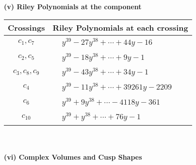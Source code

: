 \documentclass[1p]{elsarticle_modified}
\theoremstyle{definition}
\begin{document}
\newpage\renewcommand{\arraystretch}{1}
\flushleft \textbf{(v) Riley Polynomials at the component}\newline \\
\begin{tabular}{m{50pt}|m{274pt}}
Crossings & \hspace{64pt}Riley Polynomials at each crossing \\
\hline $$\begin{aligned}c_{1},c_{7}\end{aligned}$$&$\begin{aligned}
&y^{39}-27 y^{38}+\cdots+44 y-16
\end{aligned}$\\
\hline $$\begin{aligned}c_{2},c_{5}\end{aligned}$$&$\begin{aligned}
&y^{39}-18 y^{38}+\cdots+9 y-1
\end{aligned}$\\
\hline $$\begin{aligned}c_{3},c_{8},c_{9}\end{aligned}$$&$\begin{aligned}
&y^{39}-43 y^{38}+\cdots+34 y-1
\end{aligned}$\\
\hline $$\begin{aligned}c_{4}\end{aligned}$$&$\begin{aligned}
&y^{39}-11 y^{38}+\cdots+39261 y-2209
\end{aligned}$\\
\hline $$\begin{aligned}c_{6}\end{aligned}$$&$\begin{aligned}
&y^{39}+9 y^{38}+\cdots-4118 y-361
\end{aligned}$\\
\hline $$\begin{aligned}c_{10}\end{aligned}$$&$\begin{aligned}
&y^{39}+y^{38}+\cdots+76 y-1
\end{aligned}$\\
\hline
\end{tabular}\\~\\
\newpage\flushleft \textbf{(vi) Complex Volumes and Cusp Shapes}
\end{document}
